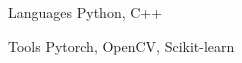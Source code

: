 



  





\begin{cvskills}
  \cvskill
    {Languages} %
    {Python, C++} %
    {}
    {}
  
  \cvskill
    {Tools}
    {Pytorch, OpenCV, Scikit-learn}
    {}
    {}


\end{cvskills}



